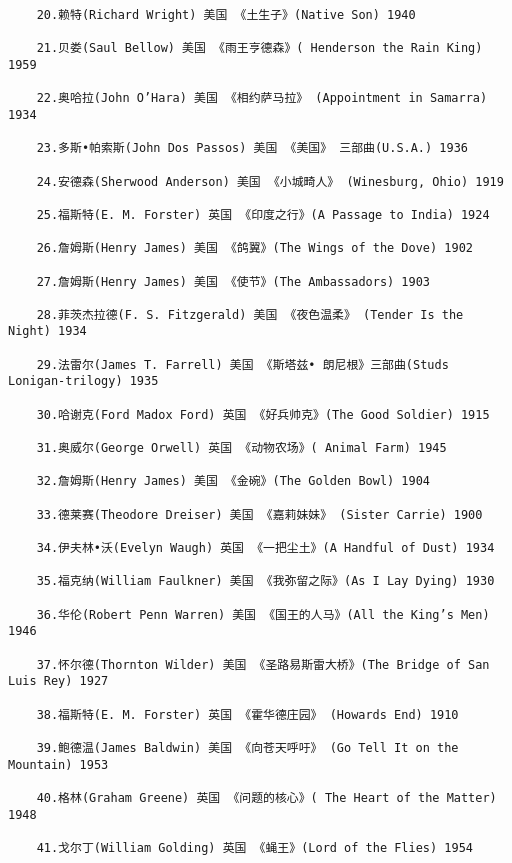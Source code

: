 \documentclass[UTF8]{../../RepresentationUniverse}
\begin{document}
\begin{lstlisting}
    20.赖特(Richard Wright) 美国 《土生子》(Native Son) 1940
    
    21.贝娄(Saul Bellow) 美国 《雨王亨德森》( Henderson the Rain King) 1959
    
    22.奥哈拉(John O’Hara) 美国 《相约萨马拉》 (Appointment in Samarra) 1934
    
    23.多斯•帕索斯(John Dos Passos) 美国 《美国》 三部曲(U.S.A.) 1936
    
    24.安德森(Sherwood Anderson) 美国 《小城畸人》 (Winesburg, Ohio) 1919
    
    25.福斯特(E. M. Forster) 英国 《印度之行》(A Passage to India) 1924
    
    26.詹姆斯(Henry James) 美国 《鸽翼》(The Wings of the Dove) 1902
    
    27.詹姆斯(Henry James) 美国 《使节》(The Ambassadors) 1903
    
    28.菲茨杰拉德(F. S. Fitzgerald) 美国 《夜色温柔》 (Tender Is the Night) 1934
    
    29.法雷尔(James T. Farrell) 美国 《斯塔兹• 朗尼根》三部曲(Studs Lonigan-trilogy) 1935
    
    30.哈谢克(Ford Madox Ford) 英国 《好兵帅克》(The Good Soldier) 1915
    
    31.奥威尔(George Orwell) 英国 《动物农场》( Animal Farm) 1945
    
    32.詹姆斯(Henry James) 美国 《金碗》(The Golden Bowl) 1904
    
    33.德莱赛(Theodore Dreiser) 美国 《嘉莉妹妹》 (Sister Carrie) 1900
    
    34.伊夫林•沃(Evelyn Waugh) 英国 《一把尘土》(A Handful of Dust) 1934
    
    35.福克纳(William Faulkner) 美国 《我弥留之际》(As I Lay Dying) 1930
    
    36.华伦(Robert Penn Warren) 美国 《国王的人马》(All the King’s Men) 1946
    
    37.怀尔德(Thornton Wilder) 美国 《圣路易斯雷大桥》(The Bridge of San Luis Rey) 1927
    
    38.福斯特(E. M. Forster) 英国 《霍华德庄园》 (Howards End) 1910
    
    39.鲍德温(James Baldwin) 美国 《向苍天呼吁》 (Go Tell It on the Mountain) 1953
    
    40.格林(Graham Greene) 英国 《问题的核心》( The Heart of the Matter) 1948
    
    41.戈尔丁(William Golding) 英国 《蝇王》(Lord of the Flies) 1954
    

\end{lstlisting}
\end{document}
